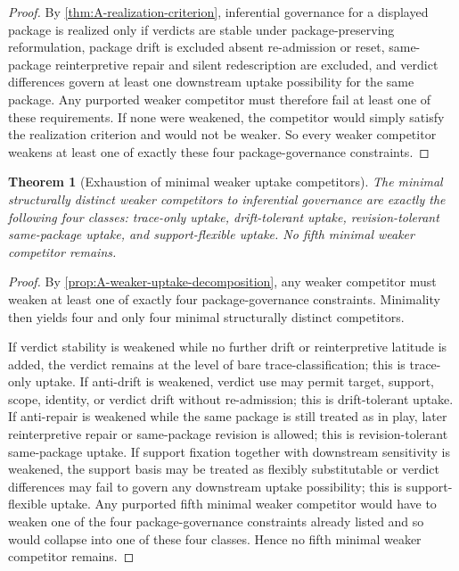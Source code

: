 \documentclass[11pt]{article}
\theoremstyle{plain}
\newtheorem{theorem}{Theorem}[section]
\theoremstyle{definition}
\begin{document}
\begin{proof}
By \cref{thm:A-realization-criterion}, inferential governance for a displayed package is realized only if verdicts are stable under package-preserving reformulation, package drift is excluded absent re-admission or reset, same-package reinterpretive repair and silent redescription are excluded, and verdict differences govern at least one downstream uptake possibility for the same package. Any purported weaker competitor must therefore fail at least one of these requirements. If none were weakened, the competitor would simply satisfy the realization criterion and would not be weaker. So every weaker competitor weakens at least one of exactly these four package-governance constraints.
\end{proof}

\begin{theorem}[Exhaustion of minimal weaker uptake competitors]
\label{thm:A-weaker-uptake-exhaustion}
The minimal structurally distinct weaker competitors to inferential governance are exactly the following four classes: trace-only uptake, drift-tolerant uptake, revision-tolerant same-package uptake, and support-flexible uptake. No fifth minimal weaker competitor remains.
\end{theorem}

\begin{proof}
By \cref{prop:A-weaker-uptake-decomposition}, any weaker competitor must weaken at least one of exactly four package-governance constraints. Minimality then yields four and only four minimal structurally distinct competitors.

If verdict stability is weakened while no further drift or reinterpretive latitude is added, the verdict remains at the level of bare trace-classification; this is trace-only uptake. If anti-drift is weakened, verdict use may permit target, support, scope, identity, or verdict drift without re-admission; this is drift-tolerant uptake. If anti-repair is weakened while the same package is still treated as in play, later reinterpretive repair or same-package revision is allowed; this is revision-tolerant same-package uptake. If support fixation together with downstream sensitivity is weakened, the support basis may be treated as flexibly substitutable or verdict differences may fail to govern any downstream uptake possibility; this is support-flexible uptake. Any purported fifth minimal weaker competitor would have to weaken one of the four package-governance constraints already listed and so would collapse into one of these four classes. Hence no fifth minimal weaker competitor remains.
\end{proof}
\end{document}
